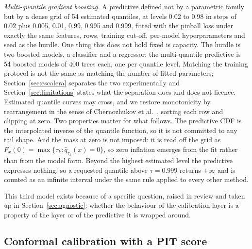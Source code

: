 \documentclass[preprint,3p,times]{elsarticle}
\providecommand{\DIFaddtex}[1]{{\protect\color{blue} \sf #1}} %
\providecommand{\DIFaddbegin}{} %
\providecommand{\DIFaddend}{} %
\providecommand{\DIFadd}[1]{\texorpdfstring{\DIFaddtex{#1}}{#1}} %
\begin{document}
\DIFadd{\emph{Multi-quantile gradient boosting.} A predictive defined not by a parametric family but by a dense grid of 54 estimated quantiles, at levels 0.02 to 0.98 in steps of 0.02 plus 0.005, 0.01, 0.99, 0.995 and 0.999, fitted with the pinball loss under exactly the same features, rows, training cut-off, per-model hyperparameters and seed as the hurdle. One thing this does not hold fixed is capacity. The hurdle is two boosted models, a classifier and a regressor; the multi-quantile predictive is 54 boosted models of 400 trees each, one per quantile level. Matching the training protocol is not the same as matching the number of fitted parameters; Section~\ref{sec:escalera} separates the two experimentally and Section~\ref{sec:limitations} states what the separation does and does not licence. Estimated quantile curves may cross, and we restore monotonicity by rearrangement in the sense of Chernozhukov et al.~\cite{chernozhukov2010}, sorting each row and clipping at zero. Two properties matter for what follows. The predictive CDF is the interpolated inverse of the quantile function, so it is not committed to any tail shape. And the mass at zero is not imposed: it is read off the grid as $F_x(0)=\max\{\tau_k:\hat q_{\tau_k}(x)=0\}$, so zero inflation emerges from the fit rather than from the model form. Beyond the highest estimated level the predictive expresses nothing, so a requested quantile above $\tau=0.999$ returns $+\infty$ and is counted as an infinite interval under the same rule applied to every other method.
}

\DIFadd{This third model exists because of a specific question, raised in review and taken up in Section~\ref{sec:agnostic}: whether the behaviour of the calibration layer is a property of the layer or of the predictive it is wrapped around.
}

\DIFaddend \subsection{Conformal calibration with a PIT score}
\DIFaddbegin \label{sec:pit}
\DIFaddend 
\end{document}
